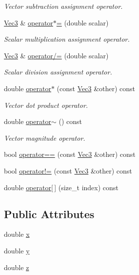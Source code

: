 \begin{DoxyCompactItemize}
\begin{DoxyCompactList}\small\item\em Vector subtraction assignment operator. \end{DoxyCompactList}\item 
\hyperlink{structcubesat_1_1Vec3}{Vec3} \& \hyperlink{structcubesat_1_1Vec3_a6ad7142feff2e98b1ab47d5892f5a5ee}{operator$\ast$=} (double scalar)
\begin{DoxyCompactList}\small\item\em Scalar multiplication assignment operator. \end{DoxyCompactList}\item 
\hyperlink{structcubesat_1_1Vec3}{Vec3} \& \hyperlink{structcubesat_1_1Vec3_a7c915443fdc168992881c3f9efe848a9}{operator/=} (double scalar)
\begin{DoxyCompactList}\small\item\em Scalar division assignment operator. \end{DoxyCompactList}\item 
double \hyperlink{structcubesat_1_1Vec3_ad35576d2c80721fe0d19e3c00dc126bc}{operator$\ast$} (const \hyperlink{structcubesat_1_1Vec3}{Vec3} \&other) const
\begin{DoxyCompactList}\small\item\em Vector dot product operator. \end{DoxyCompactList}\item 
double \hyperlink{structcubesat_1_1Vec3_ac9662dfb3fc8768396f3eec95d88fd90}{operator$\sim$} () const
\begin{DoxyCompactList}\small\item\em Vector magnitude operator. \end{DoxyCompactList}\item 
bool \hyperlink{structcubesat_1_1Vec3_a07e2df1ba6fb654bf2edb42d06ced210}{operator==} (const \hyperlink{structcubesat_1_1Vec3}{Vec3} \&other) const
\item 
bool \hyperlink{structcubesat_1_1Vec3_a8408f1827a8fbe8b38a927d70bee8d54}{operator!=} (const \hyperlink{structcubesat_1_1Vec3}{Vec3} \&other) const
\item 
double \hyperlink{structcubesat_1_1Vec3_a1464c751aea56a9d964d97dafadcec38}{operator\mbox{[}$\,$\mbox{]}} (size\+\_\+t index) const
\end{DoxyCompactItemize}
\subsection*{Public Attributes}
\begin{DoxyCompactItemize}
\item 
double \hyperlink{structcubesat_1_1Vec3_ab8dbb8bcf992eddef4692cd81d0cee59}{x}
\item 
double \hyperlink{structcubesat_1_1Vec3_a1cb7ad90c1fc62bd6c111d77215191bc}{y}
\item 
double \hyperlink{structcubesat_1_1Vec3_a1b86ce8ea2819a0a1a018dc31eda6265}{z}
\end{DoxyCompactItemize}


